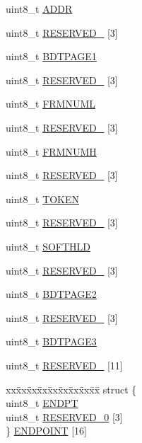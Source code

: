 \begin{DoxyCompactItemize}
uint8\+\_\+t \hyperlink{struct_u_s_b___mem_map_a0fd6ec93b02d527aefd5261b50b1996c}{A\+D\+DR}
\item 
uint8\+\_\+t \hyperlink{struct_u_s_b___mem_map_acad0f574453da7955f80d4a5dbf4663e}{R\+E\+S\+E\+R\+V\+E\+D\+\_} \mbox{[}3\mbox{]}
\item 
uint8\+\_\+t \hyperlink{struct_u_s_b___mem_map_a679d092c2b3e0582861947b4351e5354}{B\+D\+T\+P\+A\+G\+E1}
\item 
uint8\+\_\+t \hyperlink{struct_u_s_b___mem_map_a115b799187006fc5de8eb06f8d42b9bb}{R\+E\+S\+E\+R\+V\+E\+D\+\_} \mbox{[}3\mbox{]}
\item 
uint8\+\_\+t \hyperlink{struct_u_s_b___mem_map_a09975da0df19fff110854fe74d794536}{F\+R\+M\+N\+U\+ML}
\item 
uint8\+\_\+t \hyperlink{struct_u_s_b___mem_map_a4b1433abf0bec8b6193215357e46a446}{R\+E\+S\+E\+R\+V\+E\+D\+\_} \mbox{[}3\mbox{]}
\item 
uint8\+\_\+t \hyperlink{struct_u_s_b___mem_map_a7a6da4448f48d914ac3eb2fa20fd01dc}{F\+R\+M\+N\+U\+MH}
\item 
uint8\+\_\+t \hyperlink{struct_u_s_b___mem_map_a14ad2e574cba9d9c7e8cbaa4e5a078b6}{R\+E\+S\+E\+R\+V\+E\+D\+\_} \mbox{[}3\mbox{]}
\item 
uint8\+\_\+t \hyperlink{struct_u_s_b___mem_map_ab7110e88231d886d104697baee83f6f0}{T\+O\+K\+EN}
\item 
uint8\+\_\+t \hyperlink{struct_u_s_b___mem_map_ae5ed9af52b1a25b9ee9a4938a2b2ca3a}{R\+E\+S\+E\+R\+V\+E\+D\+\_} \mbox{[}3\mbox{]}
\item 
uint8\+\_\+t \hyperlink{struct_u_s_b___mem_map_a3c57aac21bb5a6e35c3002cb847140b7}{S\+O\+F\+T\+H\+LD}
\item 
uint8\+\_\+t \hyperlink{struct_u_s_b___mem_map_abda59b9594c175e7b2b7ba3b2298b599}{R\+E\+S\+E\+R\+V\+E\+D\+\_} \mbox{[}3\mbox{]}
\item 
uint8\+\_\+t \hyperlink{struct_u_s_b___mem_map_a711a77940dfc60f1b1990ea745cb3429}{B\+D\+T\+P\+A\+G\+E2}
\item 
uint8\+\_\+t \hyperlink{struct_u_s_b___mem_map_a263b76687b296e92811dda9e8051c708}{R\+E\+S\+E\+R\+V\+E\+D\+\_} \mbox{[}3\mbox{]}
\item 
uint8\+\_\+t \hyperlink{struct_u_s_b___mem_map_af12ff3314d98e240d839662ea10c7efb}{B\+D\+T\+P\+A\+G\+E3}
\item 
uint8\+\_\+t \hyperlink{struct_u_s_b___mem_map_a4b77a54e00f92e751d8361dbfa0af382}{R\+E\+S\+E\+R\+V\+E\+D\+\_} \mbox{[}11\mbox{]}
\item 
\begin{tabbing}
xx\=xx\=xx\=xx\=xx\=xx\=xx\=xx\=xx\=\kill
struct \{\\
\>uint8\_t \hyperlink{struct_u_s_b___mem_map_af33d61de8943ea382606eeef78e16800}{ENDPT}\\
\>uint8\_t \hyperlink{struct_u_s_b___mem_map_a6d02c9345b2d39c945c905d46077a0ec}{RESERVED\_0} \mbox{[}3\mbox{]}\\
\} \hyperlink{struct_u_s_b___mem_map_a3e5b2586b38472d2e1f6224de17fb9ea}{ENDPOINT} \mbox{[}16\mbox{]}\\


\end{tabbing}
\end{DoxyCompactItemize}
